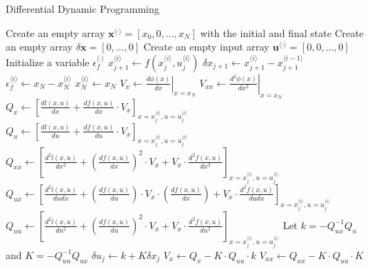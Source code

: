 \documentclass{article}
\begin{document}
\begin{algorithm}[t]
\caption{Differential Dynamic Programming}\label{DDP}
\renewcommand{\algorithmicrequire}{\textbf{Input:}}
\begin{algorithmic}[1]
\State Create an empty array $\mathbf{x}^{\langle \cdot \rangle}=[x_0,0,\ldots,x_N]$ with the initial and final state
\State Create an empty array $\delta\mathbf{x}=[0,\ldots,0]$
\State Create an empty input array $\mathbf{u}^{\langle \cdot \rangle}=[0,0,\ldots,0]$
\State Initialize a variable $\epsilon_f^{\langle \cdot \rangle}$
\textcolor{gray}{}
\textcolor{gray}{}
\State $x_{j+1}^{\langle i \rangle} \leftarrow f(x_j^{\langle i \rangle},u_j^{\langle i \rangle})$
\State $\delta x_{j+1} \leftarrow x_{j+1}^{\langle i \rangle} - x_{j+1}^{\langle i-1 \rangle}$
\EndIf
\EndFor
\State $\epsilon_f^{\langle i \rangle} \leftarrow x_N - x_N^{\langle i \rangle}$
\State $x_N^{\langle i \rangle} \leftarrow x_N$
\State $V_x \leftarrow \left.\frac{d\phi(x)}{dx}\right|_{x=x_N}$
\State $V_{xx} \leftarrow \left.\frac{d^2\phi(x)}{dx^2}\right|_{x=x_N}$
 \textcolor{gray}{}
\State $Q_x \leftarrow \left[\frac{dl(x,u)}{dx}+\frac{df(x,u)}{dx}\cdot V_x\right]_{x=x_j^{\langle i \rangle},u=u_j^{\langle i \rangle}}$
\State $Q_u \leftarrow \left[\frac{dl(x,u)}{du}+\frac{df(x,u)}{du}\cdot V_x\right]_{x=x_j^{\langle i \rangle},u=u_j^{\langle i \rangle}}$
\State $Q_{xx} \leftarrow \left[\frac{d^2l(x,u)}{dx^2}+\left(\frac{df(x,u)}{dx}\right)^2\cdot V_x + V_x \cdot \frac{d^2f(x,u)}{dx^2}\right]_{x=x_j^{\langle i \rangle},u=u_j^{\langle i \rangle}}$
\State $Q_{ux} \leftarrow \left[\frac{d^2l(x,u)}{dudx}+\left(\frac{df(x,u)}{du}\right)\cdot V_x \cdot \left(\frac{df(x,u)}{dx}\right) + V_x \cdot \frac{d^2f(x,u)}{dudx}\right]_{x=x_j^{\langle i \rangle},u=u_j^{\langle i \rangle}}$
\State $Q_{uu} \leftarrow \left[\frac{d^2l(x,u)}{du^2}+\left(\frac{df(x,u)}{du}\right)^2\cdot V_x + V_x \cdot \frac{d^2f(x,u)}{du^2}\right]_{x=x_j^{\langle i \rangle},u=u_j^{\langle i \rangle}}$
\State Let $k=-Q_{ux}^{-1}Q_{u}$ and $K=-Q_{uu}^{-1}Q_{ux}$
\State $\delta u_j \leftarrow k+K\delta x_j$\textcolor{gray}{}
\State $V_x \leftarrow Q_x-K\cdot Q_{uu}\cdot k$\textcolor{gray}{}
\State $V_{xx} \leftarrow Q_{xx}-K\cdot Q_{uu}\cdot K$
\EndFor
\EndFor
\end{algorithmic}
\end{algorithm}
\end{document}
